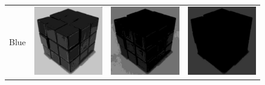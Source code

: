 \begin{figure}
\begin{tabular}{rccc}
         Blue &
         \includegraphics[width=\rubiklength]{img/rubik/1_rgb_b.jpg} & 
         \includegraphics[width=\rubiklength]{img/rubik/2_rgb_b.jpg} & \includegraphics[width=\rubiklength]{img/rubik/3_rgb_b.jpg}\\
         

\end{tabular}
\end{figure}
